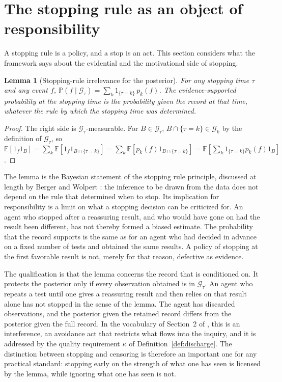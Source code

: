 \documentclass[11pt]{article}
\newcommand{\G}{\mathcal G}
\newcommand{\PP}{\mathbb P}
\newcommand{\E}{\mathbb E}
\theoremstyle{plain}
\newtheorem{lemma}{Lemma}
\theoremstyle{definition}
\begin{document}
\section{The stopping rule as an object of responsibility}\label{sec:motive}

A stopping rule is a policy, and a stop is an act. This section considers what the framework says about the evidential and the motivational side of stopping.

\begin{lemma}[Stopping-rule irrelevance for the posterior]\label{lem:rule}
For any stopping time $\tau$ and any event $f$, $\PP(f\mid\G_\tau)=\sum_k1_{\{\tau=k\}}\,p_k(f)$. The evidence-supported probability at the stopping time is the probability given the record at that time, whatever the rule by which the stopping time was determined.
\end{lemma}

\begin{proof}
The right side is $\G_\tau$-measurable. For $B\in\G_\tau$, $B\cap\{\tau=k\}\in\G_k$ by the definition of $\G_\tau$, so $\E[1_f1_B]=\sum_k\E[1_f1_{B\cap\{\tau=k\}}]=\sum_k\E[p_k(f)1_{B\cap\{\tau=k\}}]=\E[\sum_k1_{\{\tau=k\}}p_k(f)1_B]$.
\end{proof}

The lemma is the Bayesian statement of the stopping rule principle, discussed at length by Berger and Wolpert \cite{berger1988likelihood}: the inference to be drawn from the data does not depend on the rule that determined when to stop. Its implication for responsibility is a limit on what a stopping decision can be criticized for. An agent who stopped after a reassuring result, and who would have gone on had the result been different, has not thereby formed a biased estimate. The probability that the record supports is the same as for an agent who had decided in advance on a fixed number of tests and obtained the same results. A policy of stopping at the first favorable result is not, merely for that reason, defective as evidence.

The qualification is that the lemma concerns the record that is conditioned on. It protects the posterior only if every observation obtained is in $\G_\tau$. An agent who repeats a test until one gives a reassuring result and then relies on that result alone has not stopped in the sense of the lemma. The agent has discarded observations, and the posterior given the retained record differs from the posterior given the full record. In the vocabulary of Section~2 of \cite{flyxion2026law}, this is an interference, an avoidance act that restricts what flows into the inquiry, and it is addressed by the quality requirement $\kappa$ of Definition~\ref{def:discharge}. The distinction between stopping and censoring is therefore an important one for any practical standard: stopping early on the strength of what one has seen is licensed by the lemma, while ignoring what one has seen is not.
\end{document}
